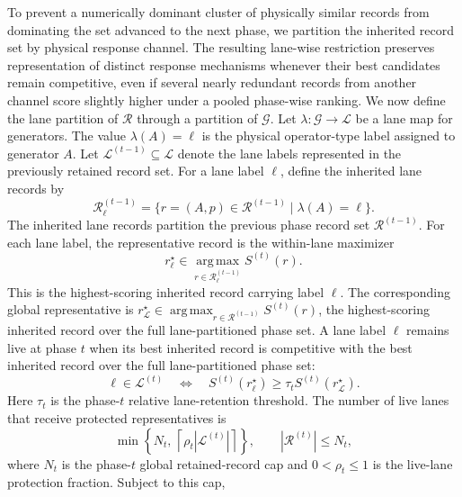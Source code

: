 \documentclass[
  reprint,
  amsmath,
  amssymb,
  aps,
  pra,
  nofootinbib,
  superscriptaddress,
  floatfix
]{revtex4-2}
\begin{document}
To prevent a numerically dominant cluster of physically similar records from
dominating the set advanced to the next phase, we partition the inherited record
set by physical response channel. The resulting lane-wise restriction preserves
representation of distinct response mechanisms whenever their best candidates
remain competitive, even if several nearly redundant records from another
channel score slightly higher under a pooled phase-wise ranking. We now define
the lane partition of \(\mathcal R\) through a partition of \(\mathcal G\). Let
\(\lambda:\mathcal G\to\mathcal L\) be a lane map for generators. The value
\(\lambda(A)=\ell\) is the physical operator-type label assigned to generator
\(A\). Let
\(\mathcal L^{(t-1)}\subseteq\mathcal L\) denote the lane labels represented in
the previously retained record set. For a lane label \(\ell\), define the
inherited lane records by
\begin{equation*}
\mathcal R_{\ell}^{(t-1)}
=
\{r=(A,p)\in\mathcal R^{(t-1)}
\mid \lambda(A)=\ell\}.
\end{equation*}
The inherited lane records partition the previous phase record set
\(\mathcal R^{(t-1)}\).
For each lane label, the representative record is the within-lane maximizer
\[
r_{\ell}^{\star}\in
\operatorname*{arg\,max}_{r\in\mathcal R_{\ell}^{(t-1)}}S^{(t)}(r).
\]
This is the highest-scoring inherited record carrying label \(\ell\). The
corresponding global representative is \(r_{\mathcal L}^{\star}\in
\operatorname*{arg\,max}_{r\in\mathcal R^{(t-1)}}S^{(t)}(r)\),
the highest-scoring inherited record over the full lane-partitioned phase set.
A lane label \(\ell\) remains live at phase \(t\) when its best inherited
record is competitive with the best inherited record over the full
lane-partitioned phase set:
\begin{equation}
\ell\in\mathcal L^{(t)}
\quad\Longleftrightarrow\quad
S^{(t)}(r_{\ell}^{\star})
\ge
\tau_t
S^{(t)}(r_{\mathcal L}^{\star}).
\label{eq:phase_restriction_map}
\end{equation}
Here \(\tau_t\) is the phase-\(t\) relative lane-retention threshold. The
number of live lanes that receive protected representatives is
\begin{equation}
\min\left\{
N_t,\,
\left\lceil \rho_t|\mathcal L^{(t)}|\right\rceil
\right\},
\qquad
|\mathcal R^{(t)}|\le N_t ,
\label{eq:phase_lane_budget}
\end{equation}
where \(N_t\) is the phase-\(t\) global retained-record cap and
\(0<\rho_t\le 1\) is the live-lane protection fraction. Subject to this cap,
\end{document}
